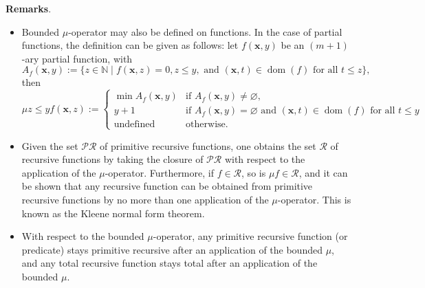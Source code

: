 \documentclass[12pt]{article}
\begin{document}
\textbf{Remarks}.
\begin{itemize}
\item
Bounded $\mu$-operator may also be defined on functions.  In the case of partial functions, the definition can be given as follows: let $f(\boldsymbol{x},y)$ be an $(m+1)$-ary partial function, with
$$A_f(\boldsymbol{x},y):=\lbrace z \in \mathbb{N} \mid f(\boldsymbol{x},z)=0, z\le y,\mbox{ and }(\boldsymbol{x},t)\in \operatorname{dom}(f)\mbox{ for all }t\le z  \rbrace,$$
then
\begin{displaymath}
\mu z\le y f(\boldsymbol{x},z) := \left\{
\begin{array}{ll}
\min A_f(\boldsymbol{x},y) & \textrm{if } A_f(\boldsymbol{x},y)\ne \varnothing, \\
y+1 & \textrm{if }A_f(\boldsymbol{x},y)= \varnothing \mbox{ and }(\boldsymbol{x},t) \in \operatorname{dom}(f) \mbox{ for all }t\le y \\
\textrm{undefined} & \textrm{otherwise.}
\end{array}
\right.
\end{displaymath}
\item
Given the set $\mathcal{PR}$ of primitive recursive functions, one obtains the set $\mathcal{R}$ of recursive functions by taking the closure of $\mathcal{PR}$ with respect to the application of the $\mu$-operator.  Furthermore, if $f\in \mathcal{R}$, so is $\mu f \in \mathcal{R}$, and it can be shown that any recursive function can be obtained from primitive recursive functions by no more than one application of the $\mu$-operator.  This is known as the Kleene normal form theorem.
\item
With respect to the bounded $\mu$-operator, any primitive recursive function (or predicate) stays primitive recursive after an application of the bounded $\mu$, and any total recursive function stays total after an application of the bounded $\mu$.
\end{itemize}
\end{document}

